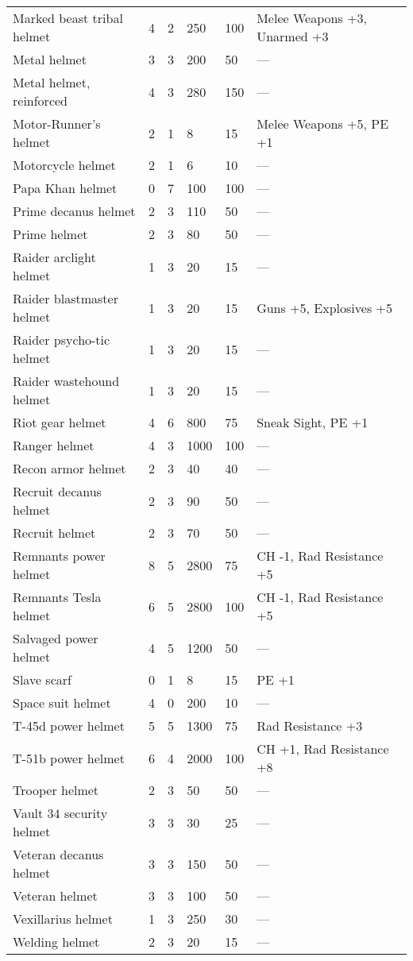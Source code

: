 \begin{longtable}{|p{5cm}|p{0.8cm}|p{1.3cm}|p{1.1cm}|p{1.2cm}|p{5.5cm}|}
Marked beast tribal helmet & 4 & 2 & 250 & 100 & Melee Weapons +3, Unarmed +3 \\
Metal helmet & 3 & 3 & 200 & 50 & — \\
Metal helmet, reinforced & 4 & 3 & 280 & 150 & — \\
Motor-Runner's helmet & 2 & 1 & 8 & 15 & Melee Weapons +5, PE +1 \\
Motorcycle helmet & 2 & 1 & 6 & 10 & — \\
Papa Khan helmet & 0 & 7 & 100 & 100 & — \\
Prime decanus helmet & 2 & 3 & 110 & 50 & — \\
Prime helmet & 2 & 3 & 80 & 50 & — \\
Raider arclight helmet & 1 & 3 & 20 & 15 & — \\
Raider blastmaster helmet & 1 & 3 & 20 & 15 & Guns +5, Explosives +5 \\
Raider psycho-tic helmet & 1 & 3 & 20 & 15 & — \\
Raider wastehound helmet & 1 & 3 & 20 & 15 & — \\
Riot gear helmet & 4 & 6 & 800 & 75 & Sneak Sight, PE +1 \\
Ranger helmet & 4 & 3 & 1000 & 100 & — \\
Recon armor helmet & 2 & 3 & 40 & 40 & — \\
Recruit decanus helmet & 2 & 3 & 90 & 50 & — \\
Recruit helmet & 2 & 3 & 70 & 50 & — \\
Remnants power helmet & 8 & 5 & 2800 & 75 & CH -1, Rad Resistance +5 \\
Remnants Tesla helmet & 6 & 5 & 2800 & 100 & CH -1, Rad Resistance +5 \\
Salvaged power helmet & 4 & 5 & 1200 & 50 & — \\
Slave scarf & 0 & 1 & 8 & 15 & PE +1 \\
Space suit helmet & 4 & 0 & 200 & 10 & — \\
T-45d power helmet & 5 & 5 & 1300 & 75 & Rad Resistance +3 \\
T-51b power helmet & 6 & 4 & 2000 & 100 & CH +1, Rad Resistance +8 \\
Trooper helmet & 2 & 3 & 50 & 50 & — \\
Vault 34 security helmet & 3 & 3 & 30 & 25 & — \\
Veteran decanus helmet & 3 & 3 & 150 & 50 & — \\
Veteran helmet & 3 & 3 & 100 & 50 & — \\
Vexillarius helmet & 1 & 3 & 250 & 30 & — \\
Welding helmet & 2 & 3 & 20 & 15 & — \\
\hline
\end{longtable}
